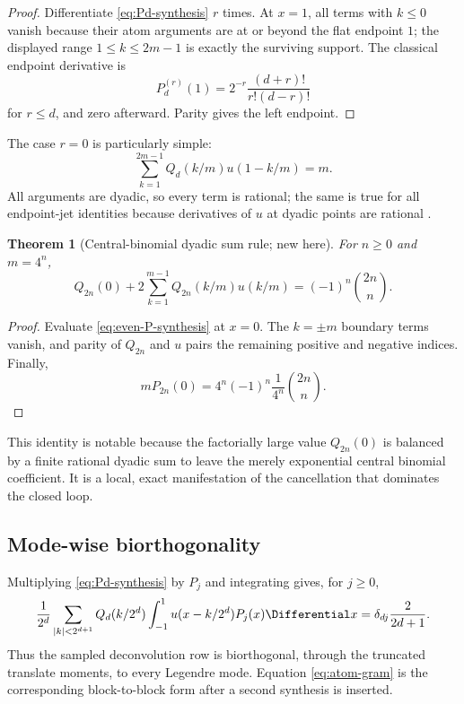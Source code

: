 \documentclass[11pt,oneside]{article}
\numberwithin{equation}{section}
\newtheorem{theorem}{Theorem}[section]
\theoremstyle{definition}
\theoremstyle{remark}
\begin{document}
\begin{proof}
Differentiate \eqref{eq:Pd-synthesis} $r$ times.  At $x=1$, all terms with
$k\le0$ vanish because their atom arguments are at or beyond the flat endpoint
$1$; the displayed range $1\le k\le2m-1$ is exactly the surviving support.
The classical endpoint derivative is
\[
 P_d^{(r)}(1)=2^{-r}\frac{(d+r)!}{r!(d-r)!}
\]
for $r\le d$, and zero afterward.  Parity gives the left endpoint.
\end{proof}

The case $r=0$ is particularly simple:
\begin{equation}
 \sum_{k=1}^{2m-1}Q_d(k/m)u(1-k/m)=m.
 \label{eq:endpoint-value-sum}
\end{equation}
All arguments are dyadic, so every term is rational; the same is true for all
endpoint-jet identities because derivatives of $u$ at dyadic points are
rational \cite{Arias1982}.

\begin{theorem}[Central-binomial dyadic sum rule; new here]
\label{thm:center-sum}
For $n\ge0$ and $m=4^n$,
\begin{equation}
 \boxed{
 Q_{2n}(0)+2\sum_{k=1}^{m-1}Q_{2n}(k/m)u(k/m)
 =(-1)^n\binom{2n}{n}.}
 \label{eq:center-sum}
\end{equation}
\end{theorem}

\begin{proof}
Evaluate \eqref{eq:even-P-synthesis} at $x=0$.  The $k=\pm m$ boundary terms
vanish, and parity of $Q_{2n}$ and $u$ pairs the remaining positive and
negative indices.  Finally,
\[
 mP_{2n}(0)=4^n(-1)^n\frac1{4^n}\binom{2n}{n}.
\]
\end{proof}

This identity is notable because the factorially large value $Q_{2n}(0)$ is
balanced by a finite rational dyadic sum to leave the merely exponential
central binomial coefficient.  It is a local, exact manifestation of the
cancellation that dominates the closed loop.

\subsection{Mode-wise biorthogonality}

Multiplying \eqref{eq:Pd-synthesis} by $P_j$ and integrating gives, for
$j\ge0$,
\begin{equation}
 \frac1{2^d}\sum_{|k|<2^{d+1}}Q_d(k/2^d)
 \int_{-1}^{1}u(x-k/2^d)P_j(x)\Differential x
 =\delta_{dj}\frac{2}{2d+1}.
 \label{eq:mode-biorthogonality}
\end{equation}
Thus the sampled deconvolution row is biorthogonal, through the truncated
translate moments, to every Legendre mode.  Equation
\eqref{eq:atom-gram} is the corresponding block-to-block form after a second
synthesis is inserted.
\end{document}
